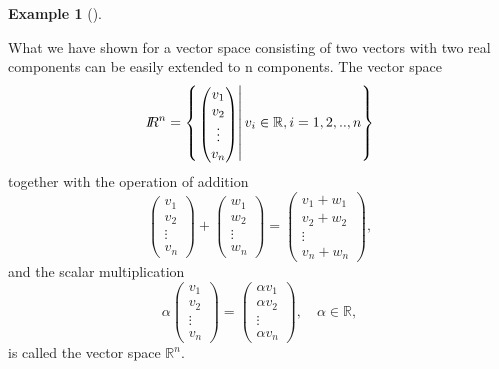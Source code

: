 \documentclass[
  a4paper,
  DIV=11,
  numbers=noendperiod,
  oneside]{scrreprt}
\theoremstyle{definition}
\newtheorem{example}{Example}[chapter]
\theoremstyle{remark}
\begin{document}
\begin{example}[]\protect\hypertarget{exm-vktspace4}{}\label{exm-vktspace4}

What we have shown for a vector space consisting of two vectors with two
real components can be easily extended to n components. The vector space
\[I\!\!R^{n} = \left\{ \left. \scriptscriptstyle \begin{pmatrix}   v_{1}\\ v_{2} \\ \vdots \\ v_{n}  \end{pmatrix} \textstyle \right| v_{i} \in \mathbb{R}, i=1,2, .. ,n \right\}\]
together with the operation of addition
\[\scriptscriptstyle \begin{pmatrix}   v_{1}\\ v_{2} \\ \vdots \\ v_{n}  \end{pmatrix} \textstyle +  \scriptscriptstyle \begin{pmatrix}   w_{1}\\ w_{2} \\ \vdots \\ w_{n}  \end{pmatrix} \textstyle =  \scriptscriptstyle \begin{pmatrix}   v_{1}+w_{1}\\ v_{2} +w_{2}\\ \vdots \\ v_{n}+w_{n}  \end{pmatrix} \textstyle , \]
and the scalar multiplication
\[ \alpha \scriptscriptstyle \begin{pmatrix}   v_{1}\\ v_{2} \\ \vdots \\ v_{n}  \end{pmatrix} \textstyle =  \scriptscriptstyle \begin{pmatrix}    \alpha v_{1}\\  \alpha v_{2} \\ \vdots \\  \alpha v_{n}  \end{pmatrix}, \textstyle \quad \alpha \in \mathbb{R},\]
is called the vector space \(\mathbb{R}^{n}\).


\end{example}
\end{document}
